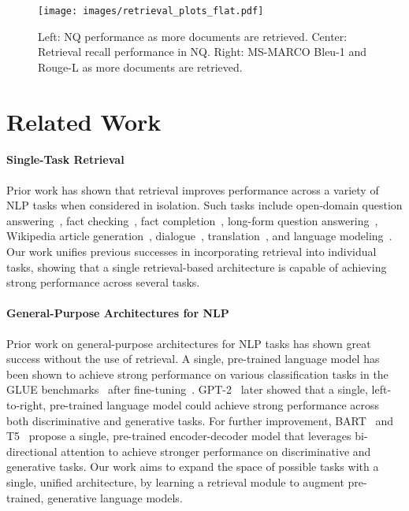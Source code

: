 \documentclass{article}
\begin{document}
\begin{figure}[h]
\centering

  \texttt{[image: images/retrieval\_plots\_flat.pdf]}
  \vspace{-17pt}
\caption{Left: NQ performance as more documents are retrieved. Center: 
Retrieval recall performance in NQ.
Right: MS-MARCO Bleu-1 and Rouge-L as more documents are retrieved. 
    }
  \label{fig:n_docs_figures}
\end{figure} 
\section{Related Work}

\paragraph{Single-Task Retrieval}
Prior work has shown that retrieval improves performance across a variety of NLP tasks when considered in isolation.
Such tasks include open-domain question answering~\cite{chen_reading_2017,kwiatkowski_natural_2019},  fact checking~\cite{thorne-etal-2018-fever}, fact completion~\cite{petroni2020how}, long-form question answering~\cite{fan-etal-2019-eli5}, Wikipedia article generation~\cite{liu2018generating}, dialogue~\cite{moghe-etal-2018-towards,weston-etal-2018-retrieve,dinan2018wizard,fan2020augmenting}, translation~\cite{gu2018search}, and language modeling~\cite{guu-etal-2018-generating,khandelwal2020generalization}.
Our work unifies previous successes in incorporating retrieval into individual tasks, showing that a single retrieval-based architecture is capable of achieving strong performance across several tasks.

\paragraph{General-Purpose Architectures for NLP}
Prior work on general-purpose architectures for NLP tasks has shown great success without the use of retrieval.
A single, pre-trained language model has been shown to achieve strong performance on various classification tasks in the GLUE benchmarks~\cite{wang-etal-2018-glue,wang_superglue_2019} after fine-tuning~\cite{radford_improving_2018,devlin_bert:_2019}.
GPT-2~\citep{radford2019language} later showed that a single, left-to-right, pre-trained language model could achieve strong performance across both discriminative and generative tasks.
For further improvement, BART~\cite{lewis2019bart} and T5~\cite{raffel2019t5,roberts2020t5cqba} propose a single, pre-trained encoder-decoder model that leverages bi-directional attention to achieve stronger performance on discriminative and generative tasks.
Our work aims to expand the space of possible tasks with a single, unified architecture, by learning a retrieval module to augment pre-trained, generative language models.
\end{document}
